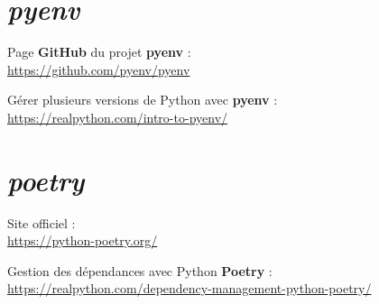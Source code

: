 \section*{\textit{pyenv}}
\begin{coloredenum}
\item Page \textbf{GitHub} du projet \textbf{pyenv} :\\ \url{https://github.com/pyenv/pyenv}
    \item Gérer plusieurs versions de Python avec \textbf{pyenv} :\\ \url{https://realpython.com/intro-to-pyenv/}
\end{coloredenum}

\section*{\textit{poetry}}
\begin{coloredenum}
    \item Site officiel :\\ \url{https://python-poetry.org/}
    \item Gestion des dépendances avec Python \textbf{Poetry} :\\ \url{https://realpython.com/dependency-management-python-poetry/}
\end{coloredenum}
